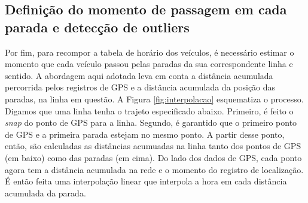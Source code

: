 \documentclass[        
    a4paper,          %
    12pt,             %
    chapter=TITLE,    %
    section=Title,    %
    subsection=Title, %
    oneside,          %
    english,          %
    spanish,          %
    brazil,           %
    fleqn             %
]{abntex2}
\begin{document}
  \hypertarget{momento-parada}{%
  \subsection{Definição do momento de passagem em cada parada e detecção de outliers}\label{momento-parada}}
  
  Por fim, para recompor a tabela de horário dos veículos, é necessário estimar o momento que cada veículo passou pelas paradas da sua correspondente linha e sentido. A abordagem aqui adotada leva em conta a distância acumulada percorrida pelos registros de GPS e a distância acumulada da posição das paradas, na linha em questão. A Figura \ref{fig:interpolacao} esquematiza o processo. Digamos que uma linha tenha o trajeto especificado abaixo. Primeiro, é feito o \emph{snap} do ponto de GPS para a linha. Segundo, é garantido que o primeiro ponto de GPS e a primeira parada estejam no mesmo ponto. A partir desse ponto, então, são calculadas as distâncias acumuadas na linha tanto dos pontos de GPS (em baixo) como das paradas (em cima). Do lado dos dados de GPS, cada ponto agora tem a distância acumulada na rede e o momento do registro de localização. É então feita uma interpolação linear que interpola a hora em cada distância acumulada da parada.
  
  \begin{figure}[!h]
  \captionsetup{width=16cm}
  \centering
  \end{figure}
  
\end{document}
